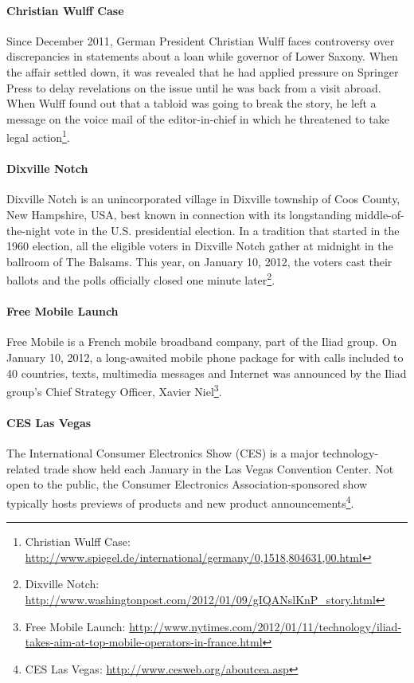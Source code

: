 \documentclass{acm_proc_article-sp}
\newcommand{\inlinelistingsize}{\fontsize{8pt}{11pt}}
\let\oldurl\url
\renewcommand{\url}[1]{\inlinelistingsize\oldurl{#1}}
\begin{document}
\paragraph{Christian Wulff Case}
Since December 2011, German President Christian Wulff faces controversy over discrepancies in statements about a loan while governor of Lower Saxony.
When the affair settled down, it was revealed that he had applied pressure on Springer Press to delay revelations on the issue until he was back from a visit abroad.
When Wulff found out that a tabloid was going to break the story, he left a message on the voice mail of the editor-in-chief in which he threatened to take legal action\footnote{Christian Wulff Case: \url{http://www.spiegel.de/international/germany/0,1518,804631,00.html}}.

\paragraph{Dixville Notch}
Dixville Notch is an unincorporated village in Dixville township of Coos County, New Hampshire, USA, best known in connection with its longstanding middle-of-the-night vote in the U.S. presidential election.
In a tradition that started in the 1960 election, all the eligible voters in Dixville Notch gather at midnight in the ballroom of The Balsams.
This year, on January 10, 2012, the voters cast their ballots and the polls officially closed one minute later\footnote{Dixville Notch: \url{http://www.washingtonpost.com/2012/01/09/gIQANslKnP_story.html}}.

\paragraph{Free Mobile Launch}
Free Mobile is a French mobile broadband company, part of the Iliad group.
On January 10, 2012, a long-awaited mobile phone package for  with calls included to 40 countries, texts, multimedia messages and Internet was announced by the Iliad group's Chief Strategy Officer, Xavier Niel\footnote{Free Mobile Launch: \url{http://www.nytimes.com/2012/01/11/technology/iliad-takes-aim-at-top-mobile-operators-in-france.html}}.

\paragraph{CES Las Vegas}
The International Consumer Electronics Show (CES) is a major technology-related trade show held each January in the Las Vegas Convention Center.
Not open to the public, the Consumer Electronics Association-sponsored show typically hosts previews of products and new product announcements\footnote{CES Las Vegas: \url{http://www.cesweb.org/aboutcea.asp}}.
\end{document}
